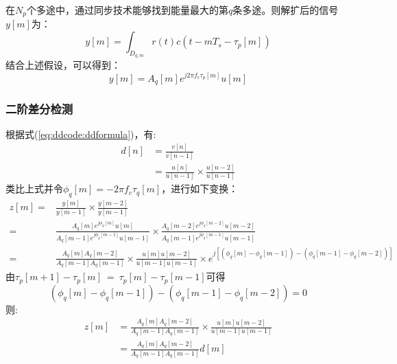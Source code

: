 	在$N_p$个多途中，通过同步技术能够找到能量最大的第$q$条多途。则解扩后的信号$y[m]$为：
\begin{equation}
	y[m]=\int_{D_{q,m}}^{}r(t)c(t-mT_s-\tau_p[m])
\end{equation}结合上述假设，可以得到\cite{liu2014long}：
\begin{equation}
	y[m]=A_q[m]e^{j2\pi f_c\tau_p[m]}u[m]
\end{equation}

\subsubsection{二阶差分检测}
	根据式(\ref{eq:ddcode:ddformula})，有:
\begin{equation}
\begin{split}
	d[n]&=\frac{v[n]}{v[n-1]} \\
	    &=\frac{u[n]}{u[n-1]}\times\frac{u[n-2]}{u[n-1]}
\end{split}
\end{equation}
类比上式并令$\phi_q[m]=-2\pi f_c \tau_q[m]$，进行如下变换：
\begin{equation}
\begin{split}
	z[m]=&\frac{y[m]}{y[m-1]}\times\frac{y[m-2]}{y[m-1]} \\
	=&\frac{A_q[m]e^{j\phi_q[m]} u[m]}{A_q[m-1]e^{j\phi_q[m-1]} u[m-1]} \times \frac{A_q[m-2]e^{j\phi_q[m-2]} u[m-2]}{A_q[m-1]e^{j\phi_q[m-1]} u[m-1]} \\
	=&\frac{A_q[m]A_q[m-2]}{A_q[m-1]A_q[m-1]}\times\frac{u[m]u[m-2]}{u[m-1]u[m-1]}\times e^{j\left[(\phi_q[m]-\phi_q[m-1]) - (\phi_q[m-1] - \phi_q[m-2])\right]}
\end{split}
\end{equation}
由$\tau_p[m+1] -\tau_p[m]~=~\tau_p[m]-\tau_p[m-1]$可得\[ (\phi_q[m]-\phi_q[m-1]) - (\phi_q[m-1] - \phi_q[m-2]) = 0 \]则:
\begin{equation}
\begin{split}
z[m]&=\frac{A_q[m]A_q[m-2]}{A_q[m-1]A_q[m-1]}\times\frac{u[m]u[m-2]}{u[m-1]u[m-1]} \\
    &=\frac{A_q[m]A_q[m-2]}{A_q[m-1]A_q[m-1]}d[m]
\end{split}
\end{equation}




		
	